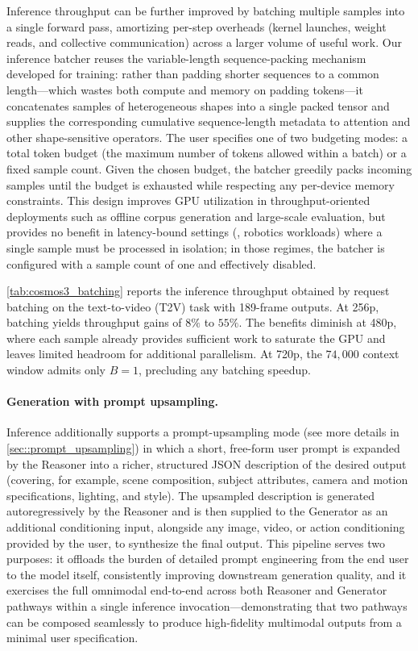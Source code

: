 Inference throughput can be further improved by batching multiple samples into a single forward pass, amortizing per-step overheads (kernel launches, weight reads, and collective communication) across a larger volume of useful work. Our inference batcher reuses the variable-length sequence-packing mechanism developed for training: rather than padding shorter sequences to a common length---which wastes both compute and memory on padding tokens---it concatenates samples of heterogeneous shapes into a single packed tensor and supplies the corresponding cumulative sequence-length metadata to attention and other shape-sensitive operators. The user specifies one of two budgeting modes: a total token budget (the maximum number of tokens allowed within a batch) or a fixed sample count. Given the chosen budget, the batcher greedily packs incoming samples until the budget is exhausted while respecting any per-device memory constraints. This design improves GPU utilization in throughput-oriented deployments such as offline corpus generation and large-scale evaluation, but provides no benefit in latency-bound settings (\eg, robotics workloads) where a single sample must be processed in isolation; in those regimes, the batcher is configured with a sample count of one and effectively disabled.

\cref{tab:cosmos3_batching} reports the inference throughput obtained by request batching on the text-to-video (T2V) task with 189-frame outputs. At 256p, batching yields throughput gains of $8\%$ to $55\%$. The benefits diminish at 480p, where each sample already provides sufficient work to saturate the GPU and leaves limited headroom for additional parallelism. At 720p, the $74{,}000$ context window admits only $B{=}1$, precluding any batching speedup.



\paragraph{Generation with prompt upsampling.}

Inference additionally supports a prompt-upsampling mode (see more details in \cref{sec::prompt_upsampling}) in which a short, free-form user prompt is expanded by the Reasoner into a richer, structured JSON description of the desired output (covering, for example, scene composition, subject attributes, camera and motion specifications, lighting, and style). The upsampled description is generated autoregressively by the Reasoner and is then supplied to the Generator as an additional conditioning input, alongside any image, video, or action conditioning provided by the user, to synthesize the final output. This pipeline serves two purposes: it offloads the burden of detailed prompt engineering from the end user to the model itself, consistently improving downstream generation quality, and it exercises the full omnimodal end-to-end across both Reasoner and Generator pathways within a single inference invocation---demonstrating that two pathways can be composed seamlessly to produce high-fidelity multimodal outputs from a minimal user specification.

